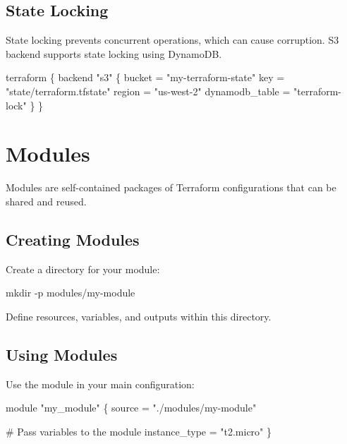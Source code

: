\documentclass[
  letterpaper,
  DIV=11,
  numbers=noendperiod]{scrreprt}
\newenvironment{Shaded}{\begin{snugshade}}{\end{snugshade}}
\newcommand{\AttributeTok}[1]{\textcolor[rgb]{0.40,0.45,0.13}{#1}}
\newcommand{\FunctionTok}[1]{\textcolor[rgb]{0.28,0.35,0.67}{#1}}
\newcommand{\NormalTok}[1]{\textcolor[rgb]{0.00,0.23,0.31}{#1}}
\begin{document}
\subsection{State Locking}\label{state-locking}

State locking prevents concurrent operations, which can cause
corruption. S3 backend supports state locking using DynamoDB.

\begin{Shaded}
\begin{Highlighting}[]
\NormalTok{terraform \{}
\NormalTok{  backend "s3" \{}
\NormalTok{    bucket         = "my{-}terraform{-}state"}
\NormalTok{    key            = "state/terraform.tfstate"}
\NormalTok{    region         = "us{-}west{-}2"}
\NormalTok{    dynamodb\_table = "terraform{-}lock"}
\NormalTok{  \}}
\NormalTok{\}}
\end{Highlighting}
\end{Shaded}

\section{Modules}\label{modules}

Modules are self-contained packages of Terraform configurations that can
be shared and reused.

\subsection{Creating Modules}\label{creating-modules-1}

Create a directory for your module:

\begin{Shaded}
\begin{Highlighting}[]
\FunctionTok{mkdir} \AttributeTok{{-}p}\NormalTok{ modules/my{-}module}
\end{Highlighting}
\end{Shaded}

Define resources, variables, and outputs within this directory.

\subsection{Using Modules}\label{using-modules}

Use the module in your main configuration:

\begin{Shaded}
\begin{Highlighting}[]
\NormalTok{module "my\_module" \{}
\NormalTok{  source = "./modules/my{-}module"}

\NormalTok{  \# Pass variables to the module}
\NormalTok{  instance\_type = "t2.micro"}
\NormalTok{\}}
\end{Highlighting}
\end{Shaded}
\end{document}
